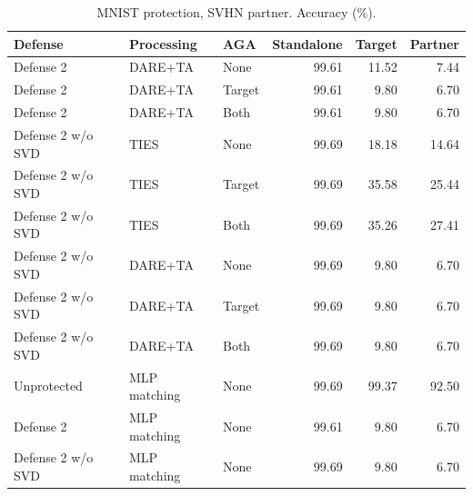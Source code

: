 \begin{table}[t]
\centering\small
\caption{MNIST protection, SVHN partner. Accuracy (\%).}
\begin{tabular}{lllrrr}
\toprule
Defense & Processing & AGA & Standalone & Target & Partner \\
\midrule
Defense 2 & DARE+TA & None & 99.61 & 11.52 & 7.44 \\
Defense 2 & DARE+TA & Target & 99.61 & 9.80 & 6.70 \\
Defense 2 & DARE+TA & Both & 99.61 & 9.80 & 6.70 \\
Defense 2 w/o SVD & TIES & None & 99.69 & 18.18 & 14.64 \\
Defense 2 w/o SVD & TIES & Target & 99.69 & 35.58 & 25.44 \\
Defense 2 w/o SVD & TIES & Both & 99.69 & 35.26 & 27.41 \\
Defense 2 w/o SVD & DARE+TA & None & 99.69 & 9.80 & 6.70 \\
Defense 2 w/o SVD & DARE+TA & Target & 99.69 & 9.80 & 6.70 \\
Defense 2 w/o SVD & DARE+TA & Both & 99.69 & 9.80 & 6.70 \\
Unprotected & MLP matching & None & 99.69 & 99.37 & 92.50 \\
Defense 2 & MLP matching & None & 99.61 & 9.80 & 6.70 \\
Defense 2 w/o SVD & MLP matching & None & 99.69 & 9.80 & 6.70 \\
\bottomrule
\end{tabular}
\end{table}

